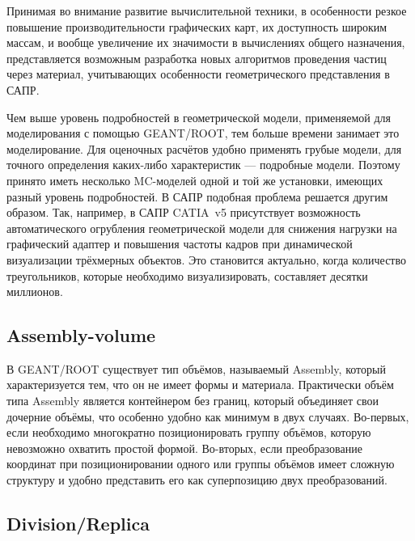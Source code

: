 Принимая во внимание развитие вычислительной техники, в особенности резкое повышение производительности графических карт, их доступность широким массам, и вообще увеличение их значимости в вычислениях общего назначения, представляется возможным разработка новых алгоритмов проведения частиц через материал, учитывающих особенности геометрического представления в САПР.

Чем выше уровень подробностей в геометрической модели, применяемой для моделирования с помощью GEANT/ROOT, тем больше времени занимает это моделирование. Для оценочных расчётов удобно применять грубые модели, для точного определения каких-либо характеристик --- подробные модели. Поэтому принято иметь несколько MC-моделей одной и той же установки, имеющих разный уровень подробностей.
В САПР подобная проблема решается другим образом. Так, например, в САПР CATIA~v5 присутствует возможность автоматического огрубления геометрической модели для снижения нагрузки на графический адаптер и повышения частоты кадров при динамической визуализации трёхмерных объектов. Это становится актуально, когда количество треугольников, которые необходимо визуализировать, составляет десятки миллионов.

\subsection{Assembly-volume}\label{sec:secAssemblyVolume}

В GEANT/ROOT существует тип объёмов, называемый Assembly, который характеризуется тем, что он не имеет формы и материала. Практически объём типа Assembly является контейнером без границ, который объединяет свои дочерние объёмы, что особенно удобно как минимум в двух случаях. Во-первых, если необходимо многократно позиционировать группу объёмов, которую невозможно охватить простой формой. Во-вторых, если преобразование координат при позиционировании одного или группы объёмов имеет сложную структуру и удобно представить его как суперпозицию двух преобразований.

\subsection{Division/Replica}\label{sec:secDivisionReplica}

